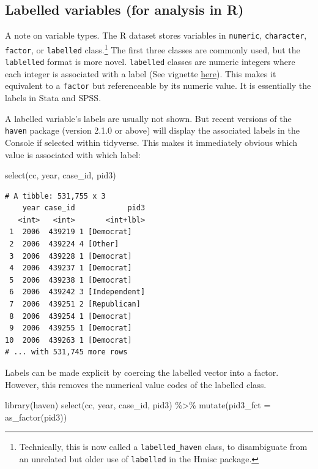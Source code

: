 \documentclass[10pt,article,oneside]{memoir}
\theoremstyle{definition}
\newenvironment{Shaded}{\begin{snugshade}}{\end{snugshade}}
\newcommand{\AttributeTok}[1]{\textcolor[rgb]{0.77,0.63,0.00}{#1}}
\newcommand{\FunctionTok}[1]{\textcolor[rgb]{0.00,0.00,0.00}{#1}}
\newcommand{\NormalTok}[1]{#1}
\newcommand{\SpecialCharTok}[1]{\textcolor[rgb]{0.00,0.00,0.00}{#1}}
\begin{document}
\hypertarget{labelled-variables-for-analysis-in-r}{%
\subsection{Labelled variables (for analysis in
R)}\label{labelled-variables-for-analysis-in-r}}

A note on variable types. The R dataset stores variables in
\texttt{numeric}, \texttt{character}, \texttt{factor}, or
\texttt{labelled} class.\footnote{Technically, this is now called a
  \texttt{labelled\_haven} class, to disambiguate from an unrelated but
  older use of \texttt{labelled} in the Hmisc package.} The first three
classes are commonly used, but the \texttt{lablelled} format is more
novel. \texttt{labelled} classes are numeric integers where each integer
is associated with a label (See vignette
\href{https://cran.r-project.org/web/packages/labelled/vignettes/intro_labelled.html}{here}).
This makes it equivalent to a \texttt{factor} but referenceable by its
numeric value. It is essentially the labels in Stata and SPSS.

A labelled variable's labels are usually not shown. But recent versions
of the \texttt{haven} package (version 2.1.0 or above) will display the
associated labels in the Console if selected within tidyverse. This
makes it immediately obvious which value is associated with which label:

\begin{Shaded}
\begin{Highlighting}[]
\FunctionTok{select}\NormalTok{(cc, year, case\_id, pid3)}
\end{Highlighting}
\end{Shaded}

\begin{verbatim}
# A tibble: 531,755 x 3
    year case_id            pid3
   <int>   <int>       <int+lbl>
 1  2006  439219 1 [Democrat]   
 2  2006  439224 4 [Other]      
 3  2006  439228 1 [Democrat]   
 4  2006  439237 1 [Democrat]   
 5  2006  439238 1 [Democrat]   
 6  2006  439242 3 [Independent]
 7  2006  439251 2 [Republican] 
 8  2006  439254 1 [Democrat]   
 9  2006  439255 1 [Democrat]   
10  2006  439263 1 [Democrat]   
# ... with 531,745 more rows
\end{verbatim}

\noindent Labels can be made explicit by coercing the labelled vector
into a factor. However, this removes the numerical value codes of the
labelled class.

\begin{Shaded}
\begin{Highlighting}[]
\FunctionTok{library}\NormalTok{(haven)}
\FunctionTok{select}\NormalTok{(cc, year, case\_id, pid3) }\SpecialCharTok{\%\textgreater{}\%} 
  \FunctionTok{mutate}\NormalTok{(}\AttributeTok{pid3\_fct =} \FunctionTok{as\_factor}\NormalTok{(pid3))}
\end{Highlighting}
\end{Shaded}
\end{document}
